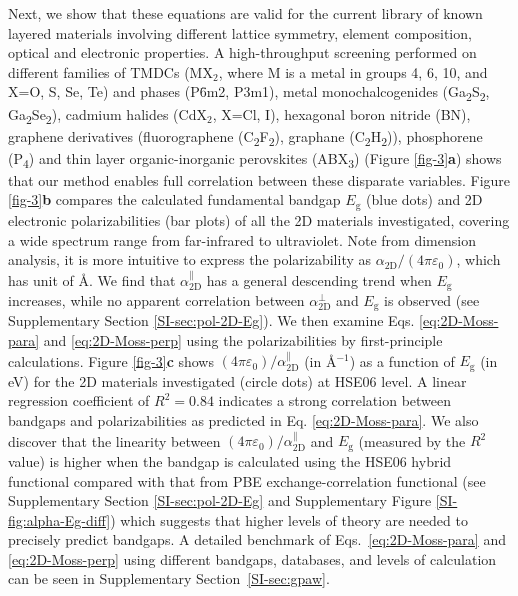 Next, we show that these equations are valid for the current
library of known layered materials involving different lattice
symmetry, element composition, optical and electronic properties.
%
A high-throughput screening performed on different families of TMDCs
(MX\(_{\text{2}}\), where M is a metal in groups 4, 6, 10, and X=O, S,
Se, Te) and phases (P\={6}m2, P3m1), metal monochalcogenides
(Ga\textsubscript{2}S\textsubscript{2},
Ga\textsubscript{2}Se\textsubscript{2}), cadmium halides (CdX$_2$,
X=Cl, I), hexagonal boron nitride (BN), graphene derivatives
(fluorographene (C\textsubscript{2}F\textsubscript{2}), graphane
(C\textsubscript{2}H\textsubscript{2})), phosphorene
(P\textsubscript{4}) and thin layer organic-inorganic perovskites
(ABX\textsubscript{3}) (Figure \ref{fig-3}{\textbf a}) shows that our
method enables full correlation between these disparate variables.
Figure \ref{fig-3}{\textbf b} compares the calculated fundamental
bandgap $E_{\mathrm{g}}$ (blue dots) and 2D electronic
polarizabilities (bar plots) of all the 2D materials investigated,
covering a wide spectrum range from far-infrared to ultraviolet.  Note
from dimension analysis, it is more intuitive to express the
polarizability as $\alpha_{\mathrm{2D}}/(4 \pi \varepsilon_{0})$,
which has unit of \AA{}. We find that
$\alpha_{\mathrm{2D}}^{\parallel}$ has a general descending trend when
$E_{\mathrm{g}}$ increases, while no apparent correlation between
$\alpha_{\mathrm{2D}}^{\perp}$ and $E_{\mathrm{g}}$ is observed (see
Supplementary Section \ref{SI-sec:pol-2D-Eg}).  We then examine
Eqs. \ref{eq:2D-Moss-para} and \ref{eq:2D-Moss-perp} using the
polarizabilities by first-principle calculations.  Figure
\ref{fig-3}\textbf{c} shows
$(4 \pi \varepsilon_{0})/\alpha_{\mathrm{2D}}^{\parallel}$ (in
\AA{}$^{-1}$) as a function of $E_{\mathrm{g}}$ (in eV) for the 2D
materials investigated (circle dots) at HSE06 level.  A linear
regression coefficient of $R^{2}=0.84$ indicates a strong correlation
between bandgaps and polarizabilities as predicted in
Eq. \ref{eq:2D-Moss-para}.  We also discover that the linearity
between $(4 \pi \varepsilon_{0})/\alpha_{\mathrm{2D}}^{\parallel}$ and
$E_{\mathrm{g}}$ (measured by the $R^{2}$ value) is higher when the
bandgap is calculated using the HSE06 hybrid functional compared with
that from PBE exchange-correlation functional (see Supplementary
Section \ref{SI-sec:pol-2D-Eg} and Supplementary Figure
\ref{SI-fig:alpha-Eg-diff}) which suggests that higher levels of
theory are needed to precisely predict bandgaps.  A detailed benchmark
of Eqs.~\ref{eq:2D-Moss-para} and \ref{eq:2D-Moss-perp} using
different bandgaps, databases, and levels of calculation can be seen
in Supplementary Section~\ref{SI-sec:gpaw}.


